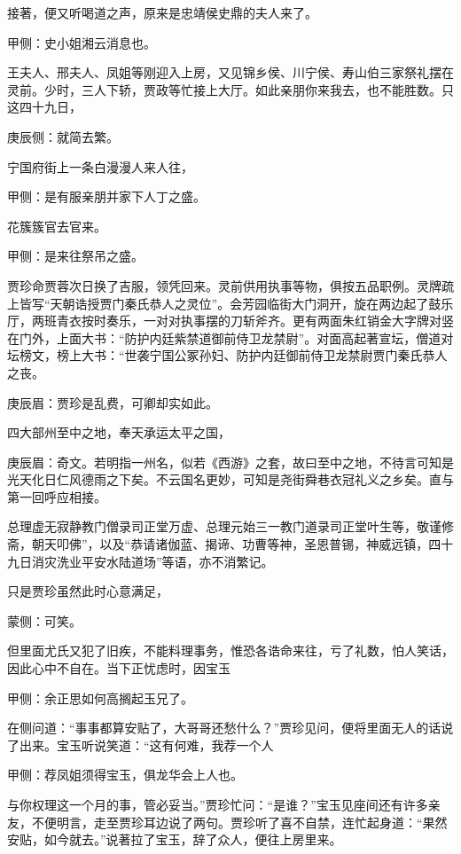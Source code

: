 \begin{parag}
    接著，便又听喝道之声，原来是忠靖侯史鼎的夫人来了。\begin{note}甲侧：史小姐湘云消息也。\end{note}王夫人、邢夫人、凤姐等刚迎入上房，又见锦乡侯、川宁侯、寿山伯三家祭礼摆在灵前。少时，三人下轿，贾政等忙接上大厅。如此亲朋你来我去，也不能胜数。只这四十九日，\begin{note}庚辰侧：就简去繁。\end{note}宁国府街上一条白漫漫人来人往，\begin{note}甲侧：是有服亲朋并家下人丁之盛。\end{note}花簇簇官去官来。\begin{note}甲侧：是来往祭吊之盛。\end{note}
\end{parag}


\begin{parag}
    贾珍命贾蓉次日换了吉服，领凭回来。灵前供用执事等物，俱按五品职例。灵牌疏上皆写“天朝诰授贾门秦氏恭人之灵位”。会芳园临街大门洞开，旋在两边起了鼓乐厅，两班青衣按时奏乐，一对对执事摆的刀斩斧齐。更有两面朱红销金大字牌对竖在门外，上面大书：“防护内廷紫禁道御前侍卫龙禁尉”。对面高起著宣坛，僧道对坛榜文，榜上大书：“世袭宁国公冢孙妇、防护内廷御前侍卫龙禁尉贾门秦氏恭人之丧。\begin{note}庚辰眉：贾珍是乱费，可卿却实如此。\end{note}四大部州至中之地，奉天承运太平之国，\begin{note}庚辰眉：奇文。若明指一州名，似若《西游》之套，故曰至中之地，不待言可知是光天化日仁风德雨之下矣。不云国名更妙，可知是尧街舜巷衣冠礼义之乡矣。直与第一回呼应相接。\end{note}总理虚无寂静教门僧录司正堂万虚、总理元始三一教门道录司正堂叶生等，敬谨修斋，朝天叩佛”，以及“恭请诸伽蓝、揭谛、功曹等神，圣恩普锡，神威远镇，四十九日消灾洗业平安水陆道场”等语，亦不消繁记。
\end{parag}


\begin{parag}
    只是贾珍虽然此时心意满足，\begin{note}蒙侧：可笑。\end{note}但里面尤氏又犯了旧疾，不能料理事务，惟恐各诰命来往，亏了礼数，怕人笑话，因此心中不自在。当下正忧虑时，因宝玉\begin{note}甲侧：余正思如何高搁起玉兄了。\end{note}在侧问道：“事事都算安贴了，大哥哥还愁什么？”贾珍见问，便将里面无人的话说了出来。宝玉听说笑道：“这有何难，我荐一个人\begin{note}甲侧：荐凤姐须得宝玉，俱龙华会上人也。\end{note}与你权理这一个月的事，管必妥当。”贾珍忙问：“是谁？”宝玉见座间还有许多亲友，不便明言，走至贾珍耳边说了两句。贾珍听了喜不自禁，连忙起身道：“果然安贴，如今就去。”说著拉了宝玉，辞了众人，便往上房里来。
\end{parag}


